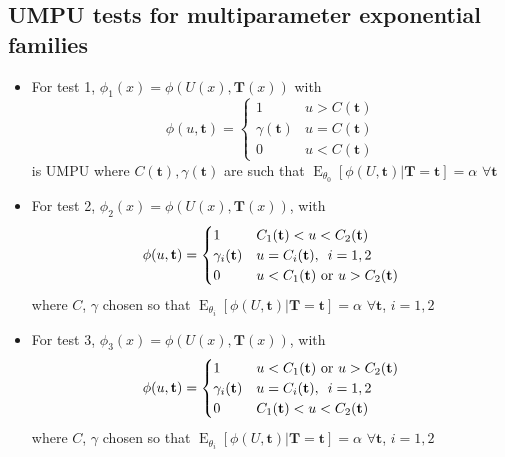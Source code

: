 \documentclass[fontsize=5pt]{scrartcl}
\DeclareMathOperator{\E}{E}
\begin{document}
\begin{multicols}{2}
\begin{itemize}
\end{itemize}

\subsection{UMPU tests for multiparameter exponential families}

\begin{itemize}
\item For test 1, $\phi_{1}(x)=\phi(U(x),\mathbf{T}(x))$ with
  \begin{equation}
    \phi(u,\mathbf{t})=\begin{cases} 1 & u>C(\mathbf{t}) \\
      \gamma(\mathbf{t}) & u = C(\mathbf{t}) \\
      0 & u < C(\mathbf{t}) \end{cases}
  \end{equation}
  is UMPU where $C(\mathbf{t}),\gamma(\mathbf{t})$ are such that
  $\E_{\theta_{0}}[\phi(U,\mathbf{t})|\mathbf{T=t}]=\alpha$ $\forall\mathbf{t}$


\item For test 2, $\phi_{2}(x) = \phi(U(x),\mathbf{T}(x))$, with
  \begin{equation}
    \phi(u,\mathbf{t})=\begin{cases}
      1 & C_{1}(\mathbf{t})<u<C_{2}(\mathbf{t}) \\
      \gamma_{i}(\mathbf{t}) & u = C_{i}(\mathbf{t}), \enskip i=1,2\\
      0 & u < C_{1}(\mathbf{t})\text{ or }u>C_{2}(\mathbf{t})
    \end{cases}
  \end{equation}
  where $C$, $\gamma$ chosen so that
  $\E_{\theta_{i}}[\phi(U,\mathbf{t})|\mathbf{T=t}]=\alpha$
  $\forall\mathbf{t}$, $i=1,2$

\item For test 3, $\phi_{3}(x) = \phi(U(x),\mathbf{T}(x))$, with
  \begin{equation}
    \phi(u,\mathbf{t})=\begin{cases}
      1 & u < C_{1}(\mathbf{t})\text{ or }u>C_{2}(\mathbf{t}) \\
      \gamma_{i}(\mathbf{t}) & u = C_{i}(\mathbf{t}), \enskip i=1,2\\
      0 & C_{1}(\mathbf{t})<u<C_{2}(\mathbf{t})
    \end{cases}
  \end{equation}
  where $C$, $\gamma$ chosen so that
  $\E_{\theta_{i}}[\phi(U,\mathbf{t})|\mathbf{T=t}]=\alpha$
  $\forall\mathbf{t}$, $i=1,2$


\end{itemize}
\end{multicols}
\end{document}
